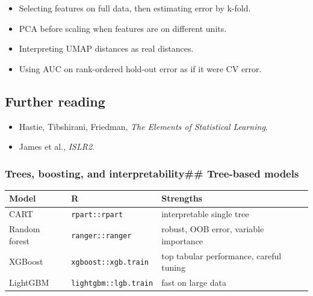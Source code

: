 \documentclass[
]{article}
\newcounter{none} %
\providecommand{\tightlist}{%
  \setlength{\itemsep}{0pt}\setlength{\parskip}{0pt}}
\begin{document}
\begin{itemize}
\tightlist
\item
  Selecting features on full data, then estimating error by k-fold.
\item
  PCA before scaling when features are on different units.
\item
  Interpreting UMAP distances as real distances.
\item
  Using AUC on rank-ordered hold-out error as if it were CV error.
\end{itemize}

\subsection{Further reading}\label{further-reading-12}

\begin{itemize}
\tightlist
\item
  Hastie, Tibshirani, Friedman, \emph{The Elements of Statistical
  Learning}.
\item
  James et al., \emph{ISLR2}.
\end{itemize}

\subsubsection{Trees, boosting, and interpretability\#\# Tree-based
models}\label{trees-boosting-and-interpretability-tree-based-models}

{\def\LTcaptype{none} %
\begin{longtable}[]{@{}
  >{\raggedright\arraybackslash}p{}
  >{\raggedright\arraybackslash}p{}
  >{\raggedright\arraybackslash}p{}@{}}
\toprule\noalign{}
\begin{minipage}[b]{\linewidth}\raggedright
Model
\end{minipage} & \begin{minipage}[b]{\linewidth}\raggedright
R
\end{minipage} & \begin{minipage}[b]{\linewidth}\raggedright
Strengths
\end{minipage} \\
\midrule\noalign{}
\endhead
\bottomrule\noalign{}
\endlastfoot
CART & \texttt{rpart::rpart} & interpretable single tree \\
Random forest & \texttt{ranger::ranger} & robust, OOB error, variable
importance \\
XGBoost & \texttt{xgboost::xgb.train} & top tabular performance, careful
tuning \\
LightGBM & \texttt{lightgbm::lgb.train} & fast on large data \\
\end{longtable}
}
\end{document}

